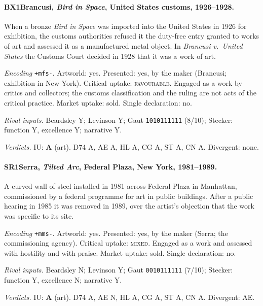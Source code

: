 \paragraph{BX1\enspace Brancusi, \emph{Bird in Space}, United States customs, 1926--1928.}
When a bronze \emph{Bird in Space} was imported into the United States in 1926 for exhibition, the customs authorities refused it the duty-free entry granted to works of art and assessed it as a manufactured metal object. In \emph{Brancusi v.\ United States} the Customs Court decided in 1928 that it was a work of art.\par
\noindent\textit{Encoding} \texttt{+mfs-}. Artworld: yes. Presented: yes, by the maker (Brancusi; exhibition in New York). Critical uptake: \textsc{favourable}. Engaged as a work by critics and collectors; the customs classification and the ruling are not acts of the critical practice. Market uptake: sold. Single declaration: no.\par
\noindent\textit{Rival inputs.} Beardsley Y; Levinson Y; Gaut \texttt{1010111111} (8/10); Stecker: function Y, excellence Y; narrative Y.\par
\noindent\textit{Verdicts.} IU: \textbf{A} (art). D74 A, AE A, HL A, CG A, ST A, CN A. Divergent: none.\par

\paragraph{SR1\enspace Serra, \emph{Tilted Arc}, Federal Plaza, New York, 1981--1989.}
A curved wall of steel installed in 1981 across Federal Plaza in Manhattan, commissioned by a federal programme for art in public buildings. After a public hearing in 1985 it was removed in 1989, over the artist's objection that the work was specific to its site.\par
\noindent\textit{Encoding} \texttt{+mms-}. Artworld: yes. Presented: yes, by the maker (Serra; the commissioning agency). Critical uptake: \textsc{mixed}. Engaged as a work and assessed with hostility and with praise. Market uptake: sold. Single declaration: no.\par
\noindent\textit{Rival inputs.} Beardsley N; Levinson Y; Gaut \texttt{0010111111} (7/10); Stecker: function Y, excellence N; narrative Y.\par
\noindent\textit{Verdicts.} IU: \textbf{A} (art). D74 A, AE N, HL A, CG A, ST A, CN A. Divergent: AE.\par

